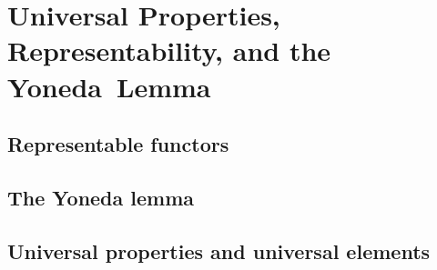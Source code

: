 \chapter{Universal Properties, Representability, and the Yoneda~Lemma}

\section{Representable functors}






\section{The Yoneda lemma}








\section{Universal properties and universal elements}

